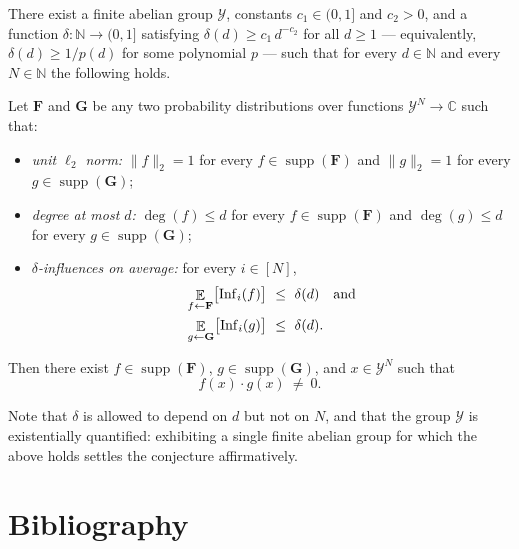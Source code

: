 \documentclass{aicr-conjecture}
\newcommand{\NN}{\mathbb{N}}
\newcommand{\CC}{\mathbb{C}}
\newcommand{\cY}{\mathcal{Y}}
\newcommand{\bF}{\mathbf{F}}
\newcommand{\bG}{\mathbf{G}}
\begin{document}
\begin{conjecture}\label{conj:main}
There exist a finite abelian group $\cY$, constants $c_1\in(0,1]$ and
$c_2>0$, and a function $\delta\colon\NN\to(0,1]$ satisfying
$\delta(d)\ge c_1\,d^{-c_2}$ for all $d\ge 1$ --- equivalently,
$\delta(d)\ge 1/p(d)$ for some polynomial $p$ --- such that for every
$d\in\NN$ and every $N\in\NN$ the following holds.

Let $\bF$ and $\bG$ be any two probability distributions over functions
$\cY^N\to\CC$ such that:
\begin{itemize}
  \item \emph{unit $\ell_2$ norm:} $\lVert f\rVert_2 = 1$ for every
  $f\in\operatorname{supp}(\bF)$ and $\lVert g\rVert_2 = 1$ for every
  $g\in\operatorname{supp}(\bG)$;
  \item \emph{degree at most $d$:} $\deg(f)\le d$ for every
  $f\in\operatorname{supp}(\bF)$ and $\deg(g)\le d$ for every
  $g\in\operatorname{supp}(\bG)$;
  \item \emph{$\delta$-influences on average:} for every $i\in[N]$,
  \[
    \begin{aligned}
      \mathop{\mathbb{E}}_{f\sample\bF}
        \bigl[\operatorname{Inf}_i(f)\bigr]
        &\ \le\ \delta(d) \quad\text{and} \\
      \mathop{\mathbb{E}}_{g\sample\bG}
        \bigl[\operatorname{Inf}_i(g)\bigr]
        &\ \le\ \delta(d).
    \end{aligned}
  \]
\end{itemize}
Then there exist $f\in\operatorname{supp}(\bF)$,
$g\in\operatorname{supp}(\bG)$, and $x\in\cY^N$ such that
\[ f(x)\cdot g(x)\ \ne\ 0. \]
\end{conjecture}

\begin{remark}
\label{rem:quant}
Note that $\delta$ is allowed to depend on $d$ but not on $N$, and that
the group $\cY$ is existentially quantified: exhibiting a single finite
abelian group for which the above holds settles the conjecture
affirmatively.
\end{remark}

\section{Bibliography}
\end{document}
